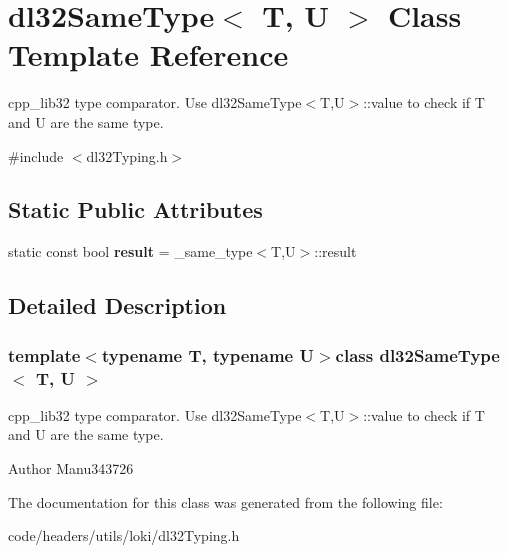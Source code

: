 \hypertarget{classdl32_same_type}{\section{dl32\-Same\-Type$<$ T, U $>$ Class Template Reference}
\label{classdl32_same_type}
}


cpp\-\_\-lib32 type comparator.  Use dl32\-Same\-Type$<$\-T,\-U$>$\-::value to check if T and U are the same type.  




{\ttfamily \#include $<$dl32\-Typing.\-h$>$}

\subsection*{Static Public Attributes}
\begin{DoxyCompactItemize}
\item 
\hypertarget{classdl32_same_type_a042cdcb67d7028cd04ba57a19d7cb725}{static const bool {\bfseries result} = \-\_\-same\-\_\-type$<$T,U$>$\-::result}\label{classdl32_same_type_a042cdcb67d7028cd04ba57a19d7cb725}

\end{DoxyCompactItemize}


\subsection{Detailed Description}
\subsubsection*{template$<$typename T, typename U$>$class dl32\-Same\-Type$<$ T, U $>$}

cpp\-\_\-lib32 type comparator.  Use dl32\-Same\-Type$<$\-T,\-U$>$\-::value to check if T and U are the same type. 

\begin{DoxyAuthor}{Author}
Manu343726 
\end{DoxyAuthor}


The documentation for this class was generated from the following file\-:\begin{DoxyCompactItemize}
\item 
code/headers/utils/loki/dl32\-Typing.\-h\end{DoxyCompactItemize}
